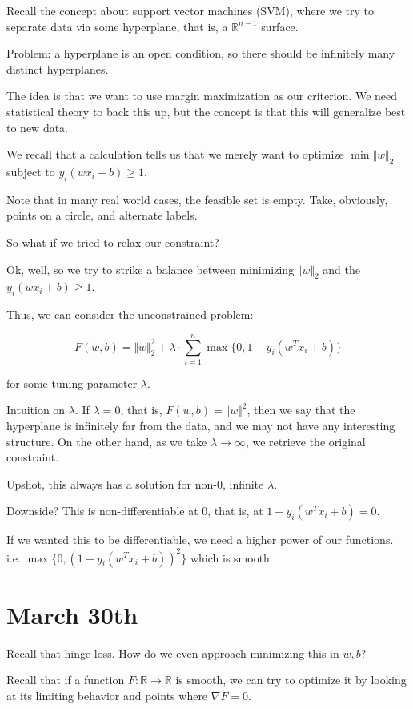 \documentclass[10pt]{article}
\begin{document}
Recall the concept about support vector machines (SVM), where we try to separate data via some hyperplane, that is, a $\mathbb{R}^{n-1}$ surface. 

Problem: a hyperplane is an open condition, so there should be infinitely many distinct hyperplanes. 

The idea is that we want to use margin maximization as our criterion. We need statistical theory to back this up, but the concept is that this will generalize best to new data.

We recall that a calculation tells us that we merely want to optimize $\min \Vert w \Vert_2$ subject to $y_i (wx_i + b) \geq 1$.

Note that in many real world cases, the feasible set is empty. Take, obviously, points on a circle, and alternate labels. 

So what if we tried to relax our constraint?

Ok, well, so we try to strike a balance between minimizing $\Vert w \Vert_2$ and the $y_i (wx_i + b) \geq 1$.

Thus, we can consider the unconstrained problem:

$$F(w,b) = \Vert w \Vert_2^2 + \lambda  \cdot \sum_{i=1}^n \max\{ 0, 1 -y_i (w^T x_i + b)\} $$

for some tuning parameter $\lambda$.

Intuition on $\lambda$. If $\lambda = 0$, that is, $F(w,b) = \Vert w \Vert^2$, then we say that the hyperplane is infinitely far from the data, and we may not have any interesting structure. On the other hand, as we take $\lambda \to \infty$, we retrieve the original constraint. 

Upshot, this always has a solution for non-0, infinite $\lambda$. 

Downside? This is non-differentiable at 0, that is, at $1 - y_i(w^T x_i + b) = 0$. 

If we wanted this to be differentiable, we need a higher power of our functions. i.e. $\max \{ 0, (1 - y_i(w^T x_i + b))^2\} $ which is smooth.

\section*{March 30th}

Recall that hinge loss. How do we even approach minimizing this in $w,b$?

Recall that if a function $F: \mathbb{R} \to \mathbb{R}$ is smooth, we can try to optimize it by looking at its limiting behavior and points where $\nabla F = 0$. 
\end{document}
